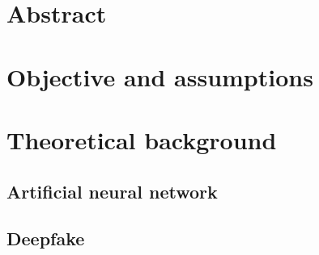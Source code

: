 \section{Abstract}
\section{Objective and assumptions}
\section{Theoretical background}
\subsection{Artificial neural network}
\subsection{Deepfake}